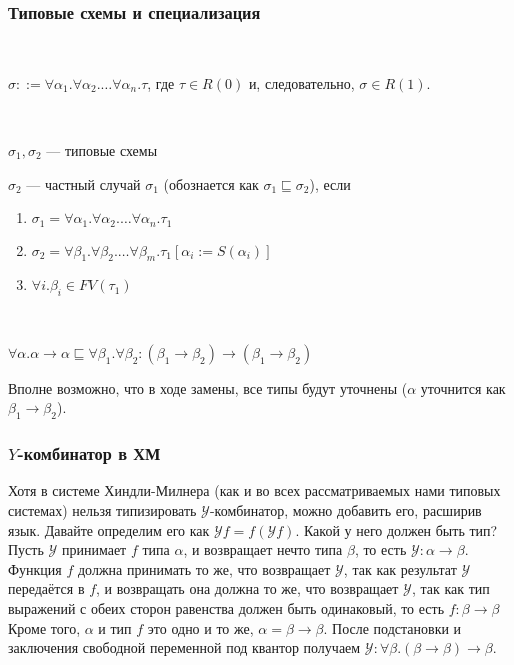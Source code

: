\subsubsection{Типовые схемы и специализация}

\begin{definition}\

$\sigma ::= \forall \alpha_1. \forall \alpha_2. \dots \forall \alpha_n. \tau$, где $\tau \in R(0)$ и, следовательно, $\sigma \in R(1)$.

\end{definition}

\begin{definition}\

$\sigma_1, \sigma_2$ --- типовые схемы

$\sigma_2$ --- частный случай $\sigma_1$ (обознается как $\sigma_1 \sqsubseteq \sigma_2$), если

\begin{enumerate}
    \item $\sigma_1 =  \forall \alpha_1. \forall \alpha_2. \dots \forall \alpha_n. \tau_1$
    \item $\sigma_2 =  \forall \beta_1. \forall \beta_2. \dots \forall \beta_m. \tau_1[\alpha_i := S(\alpha_i)]$
    \item $\forall i. \beta_i \in FV(\tau_1)$
\end{enumerate}

\end{definition}

\begin{example}\

$\forall \alpha . \alpha \rightarrow \alpha
\sqsubseteq
\forall \beta_1.\forall \beta_2: (\beta_1 \rightarrow \beta_2) \rightarrow (\beta_1 \rightarrow \beta_2)$

Вполне возможно, что в ходе замены, все типы будут уточнены ($\alpha$ уточнится как $\beta_1 \rightarrow \beta_2$).
\end{example}


\subsubsection{$Y$-комбинатор в ХМ}

Хотя в системе Хиндли-Милнера (как и во всех рассматриваемых нами типовых системах) нельзя типизировать $\mathcal{Y} $-комбинатор,
можно добавить его, расширив язык.
Давайте определим его как $\mathcal{Y} f = f \left(\mathcal{Y} f\right)$.
Какой у него должен быть тип? Пусть $\mathcal{Y}$ принимает $f$ типа $\alpha$, и возвращает нечто типа $\beta$,
то есть $\mathcal{Y}: \alpha\to\beta$.
Функция $f$ должна принимать то же, что возвращает $\mathcal{Y}$, так как результат $\mathcal{Y}$ передаётся в $f$,
и возвращать она должна то же, что возвращает $\mathcal{Y}$, так как тип выражений с обеих сторон равенства должен быть одинаковый,
то есть $f : \beta\to\beta$
Кроме того, $\alpha$ и тип $f$ это одно и то же, $\alpha=\beta\to\beta$.
После подстановки и заключения свободной переменной под квантор получаем $\mathcal{Y} : \forall\beta.(\beta\to\beta)\to\beta$.

